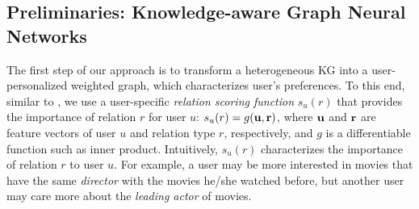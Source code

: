 \documentclass[sigconf]{acmart}
\begin{document}
	\subsection{Preliminaries: Knowledge-aware Graph Neural Networks}
		The first step of our approach is to transform a heterogeneous KG into a user-personalized weighted graph, which characterizes user's preferences.
		To this end, similar to \cite{wang2019knowledge}, we use a user-specific \textit{relation scoring function} $s_u(r)$ that provides the importance of relation $r$ for user $u$: $s_u(r) = g({\bf u}, {\bf r})$, where ${\bf u}$ and ${\bf r}$ are feature vectors of user $u$ and relation type $r$, respectively, and $g$ is a differentiable function such as inner product.
		Intuitively, $s_u(r)$ characterizes the importance of relation $r$ to user $u$.
		For example, a user may be more interested in movies that have the same \textit{director} with the movies he/she watched before, but another user may care more about the \textit{leading actor} of movies.
		
\end{document}
